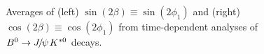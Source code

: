 \begin{figure}[htbp]
  \begin{center}
    \hfill
  \end{center}
  \vspace{-0.5cm}
  \caption{
    Averages of 
    (left) $\sin(2\beta) \equiv \sin(2\phi_1)$ and
    (right) $\cos(2\beta) \equiv \cos(2\phi_1)$
    from time-dependent analyses of $B^0 \to {J\mskip -3mu/\mskip -2mu\psi\mskip 2mu} K^{*0}$ decays.
  }
  \label{fig:cp_uta:JpsiKstar}
\end{figure}

